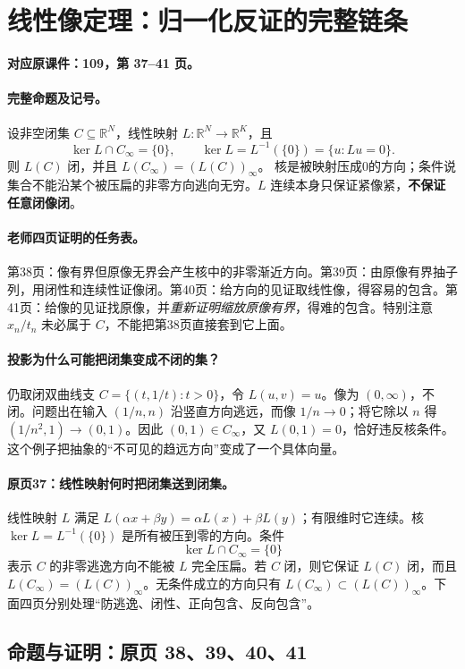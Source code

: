 \documentclass[11pt,a4paper]{article}
\newcommand{\R}{\mathbb{R}}\newcommand{\N}{\mathbb{N}}
\theoremstyle{definition}\newtheorem{definition}{定义}\newtheorem{example}{例}
\begin{document}
\clearpage\section{线性像定理：归一化反证的完整链条}\label{g:109:37}

\textbf{对应原课件：109，第 37--41 页。}


\paragraph{完整命题及记号。}
设非空闭集 $C\subseteq\R^N$，线性映射 $L:\R^N\to\R^K$，且
\[\ker L\cap C_\infty=\{0\},\qquad
\ker L=L^{-1}(\{0\})=\{u:Lu=0\}.
\]
则 $L(C)$ 闭，并且 $L(C_\infty)=(L(C))_\infty$。
核是被映射压成0的方向；条件说集合不能沿某个被压扁的非零方向逃向无穷。$L$ 连续本身只保证紧像紧，\textbf{不保证任意闭像闭}。
\paragraph{老师四页证明的任务表。}
第38页：像有界但原像无界会产生核中的非零渐近方向。第39页：由原像有界抽子列，用闭性和连续性证像闭。第40页：给方向的见证取线性像，得容易的包含。第41页：给像的见证找原像，并\emph{重新证明缩放原像有界}，得难的包含。特别注意 $x_n/t_n$ 未必属于 $C$，不能把第38页直接套到它上面。

\paragraph{投影为什么可能把闭集变成不闭的集？}
仍取闭双曲线支 $C=\{(t,1/t):t>0\}$，令 $L(u,v)=u$。像为 $(0,\infty)$，不闭。问题出在输入 $(1/n,n)$ 沿竖直方向逃远，而像 $1/n\to0$；将它除以 $n$ 得 $(1/n^2,1)\to(0,1)$。因此 $(0,1)\in C_\infty$，又 $L(0,1)=0$，恰好违反核条件。这个例子把抽象的“不可见的趋远方向”变成了一个具体向量。


\paragraph{原页37：线性映射何时把闭集送到闭集。}线性映射 $L$ 满足 $L(\alpha x+\beta y)=\alpha L(x)+\beta L(y)$；有限维时它连续。核 $\ker L=L^{-1}(\{0\})$ 是所有被压到零的方向。条件
\[\ker L\cap C_\infty=\{0\}\]
表示 $C$ 的非零逃逸方向不能被 $L$ 完全压扁。若 $C$ 闭，则它保证 $L(C)$ 闭，而且 $L(C_\infty)=(L(C))_\infty$。无条件成立的方向只有 $L(C_\infty)\subset(L(C))_\infty$。下面四页分别处理“防逃逸、闭性、正向包含、反向包含”。



\subsection{命题与证明：原页 38、39、40、41}
\end{document}
